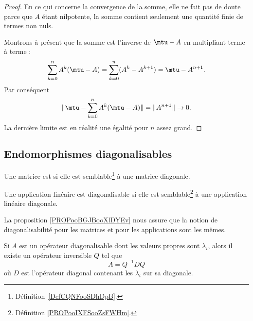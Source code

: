 \begin{proof}
	En ce qui concerne la convergence de la somme, elle ne fait pas de doute parce que \( A\) étant nilpotente, la somme contient seulement une quantité finie de termes non nuls.

	Montrons à présent que la somme est l'inverse de \( \mtu-A\) en multipliant terme à terme :
	\begin{equation}
		\sum_{k=0}^nA^k(\mtu-A)=\sum_{k=0}^n(A^k-A^{k+1})=\mtu-A^{n+1}.
	\end{equation}
	Par conséquent
	\begin{equation}
		\| \mtu-\sum_{k=0}^nA^k(\mtu-A) \|=\| A^{n+1} \|\to 0.
	\end{equation}
	La dernière limite est en réalité une égalité pour \( n\) assez grand.
\end{proof}


\subsection{Endomorphismes diagonalisables}

\begin{definition}  \label{DefCNJqsmo}
	Une matrice est  si elle est semblable\footnote{Définition~\ref{DefCQNFooSDhDpB}.} à une matrice diagonale.

	Une application linéaire est diagonalisable si elle est semblable\footnote{Définition \ref{PROPooIXFSooZsFWHm}.} à une application linéaire diagonale.
\end{definition}

La proposition \ref{PROPooBGJBooXlDYEv} nous assure que la notion de diagonalisabilité pour les matrices et pour les applications sont les mêmes.

\begin{proposition}     \label{PROPooDEETooSOMiGO}
	Si \( A\) est un opérateur diagonalisable dont les valeurs propres sont \( \lambda_i\), alors il existe un opérateur inversible \( Q\) tel que
	\begin{equation}
		A=Q^{-1} DQ
	\end{equation}
	où \( D \) est l'opérateur diagonal contenant les \( \lambda_i\) sur sa diagonale.
\end{proposition}


